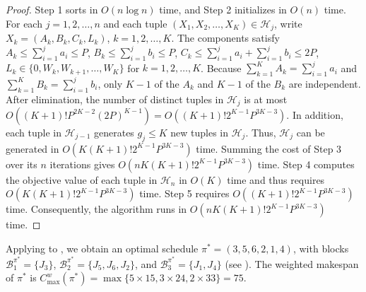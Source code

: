 \documentclass[12pt]{article}
\begin{document}
\begin{sloppypar}
\begin{proof}
            Step 1 sorts in $O(n\log n)$ time, and Step 2 initializes in $O(n)$ time. For each $j=1, 2, \ldots, n$ and each tuple $(X_1, X_2, \ldots, X_K) \in \mathcal{H}_j$, write $X_k=(A_k, B_k, C_k, L_k)$, $k=1, 2, \ldots, K$. The components satisfy $A_k \leq \sum_{i=1}^{j} a_i \leq P$, $B_k \leq \sum_{i=1}^{j} b_i \leq P$, $C_k \leq \sum_{i=1}^{j} a_i +\sum_{i=1}^{j} b_i \leq 2P$, $L_k \in \{0, W_k, W_{k+1}, \ldots, W_K\}$ for $k=1, 2, \ldots, K$. Because $\sum_{k=1}^K A_k=\sum_{i=1}^j a_i$ and $\sum_{k=1}^K B_k=\sum_{i=1}^j b_i$, only $K-1$ of the $A_k$ and $K-1$ of the $B_k$ are independent. After elimination, the number of distinct tuples in $\mathcal{H}_j$ is at most $O((K+1)! P^{2K-2} (2P)^{K-1})=O((K+1)! 2^{K-1} P^{3K-3})$. In addition, each tuple in $\mathcal{H}_{j-1}$ generates $g_j \leq K$ new tuples in $\mathcal{H}_j$. Thus, $\mathcal{H}_j$ can be generated in $O(K(K+1)! 2^{K-1} P^{3K-3})$ time. Summing the cost of Step 3 over its $n$ iterations gives $O(n K (K+1)! 2^{K-1} P^{3K-3})$ time. Step 4 computes the objective value of each tuple in $\mathcal{H}_n$ in $O(K)$ time and thus requires $O(K (K+1)! 2^{K-1} P^{3K-3})$ time. Step 5 requires $O((K+1)! 2^{K-1} P^{3K-3})$ time. Consequently, the algorithm runs in $O(n K (K+1)! 2^{K-1} P^{3K-3})$ time. 
        \end{proof}
        
        Applying  to , we obtain an optimal schedule $\pi^*=(3, 5, 6, 2, 1, 4)$, with blocks $\mathcal{B}_1^{\pi^*}=\{J_3\}$, $\mathcal{B}_2^{\pi^*}=\{J_5,J_6, J_2\}$, and $\mathcal{B}_3^{\pi^*}=\{J_1, J_4\}$ (see ). The weighted makespan of $\pi^*$ is $C_{\max}^w(\pi^*)=\max \{5 \times 15, 3 \times 24, 2 \times 33\}=75$. 
        
        \begin{figure}[H]
            \centering
\end{figure}
\end{sloppypar}
\end{document}
